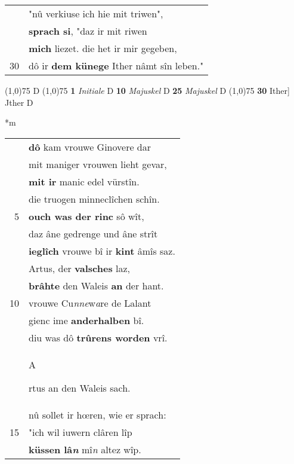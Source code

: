 \documentclass[8pt,a4paper,notitlepage]{article}
\begin{document}
\begin{table}[ht]
\begin{minipage}[t]{0.5\linewidth}
\begin{tabular}{rl}
 & "nû verkiuse ich hie mit triwen",\\ 
 & \textbf{sprach si}, "daz ir mit riwen\\ 
 & \textbf{mich} liezet. die het ir mir gegeben,\\ 
30 & dô ir \textbf{dem künege} Ither nâmt sîn leben."\\ 
\end{tabular}
\scriptsize
\line(1,0){75} \newline
D \newline
\line(1,0){75} \newline
\textbf{1} \textit{Initiale} D  \textbf{10} \textit{Majuskel} D  \textbf{25} \textit{Majuskel} D  \newline
\line(1,0){75} \newline
\textbf{30} Ither] Jther D \newline
\end{minipage}
\hspace{0.5cm}
\begin{minipage}[t]{0.5\linewidth}
\small
\begin{center}*m
\end{center}
\begin{tabular}{rl}
 & \textbf{dô} kam vrouwe Ginovere dar\\ 
 & mit maniger vrouwen lieht gevar,\\ 
 & \textbf{mit ir} manic edel vürstîn.\\ 
 & die truogen minneclîchen schîn.\\ 
5 & \textbf{ouch was der rinc} sô wît,\\ 
 & daz âne gedrenge und âne strît\\ 
 & \textbf{ieglîch} vrouwe bî ir \textbf{kint} âmîs saz.\\ 
 & Artus, der \textbf{valsches} laz,\\ 
 & \textbf{brâhte} den Waleis \textbf{an} der hant.\\ 
10 & vrouwe Cu\textit{nne}w\textit{a}re de Lalant\\ 
 & gienc ime \textbf{anderhalben} bî.\\ 
 & diu was dô \textbf{trûrens worden} vrî.\\ 
 & \begin{large}A\end{large}rtus an den Waleis sach.\\ 
 & nû sollet ir hœren, wie er sprach:\\ 
15 & "ich wil iuwern clâren lîp\\ 
 & \textbf{küssen lâ\textit{n}} mî\textit{n} altez wîp.\\ 

\end{tabular}
\end{minipage}
\end{table}
\end{document}
